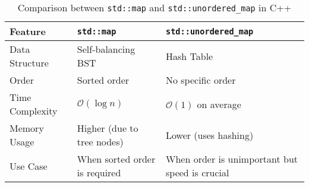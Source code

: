\begin{table}[htbp]
  \centering
  \caption{Comparison between \texttt{std::map} and \texttt{std::unordered\_map} in C++}
  \label{tab:map_vs_unorderedmap}
  \begin{tabular}{|l|l|p{5.5cm}|}
    \hline
    \textbf{Feature} & \texttt{std::map} & \texttt{std::unordered\_map} \\
    \hline
    Data Structure & Self-balancing BST & Hash Table \\
    \hline
    Order & Sorted order & No specific order \\
    \hline
    Time Complexity & $\mathcal{O}(\log n)$ & $\mathcal{O}(1)$ on average \\
    \hline
    Memory Usage & Higher (due to tree nodes) & Lower (uses hashing) \\
    \hline
    Use Case & When sorted order is required & When order is unimportant but speed is crucial \\
    \hline
  \end{tabular}
\end{table}